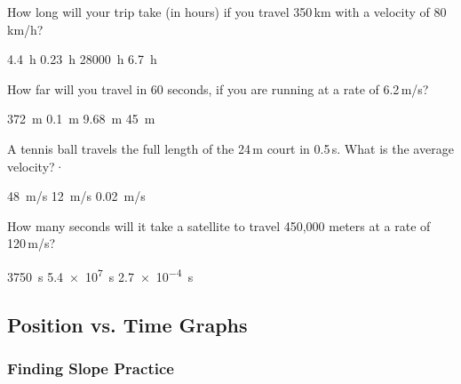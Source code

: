 \documentclass[answers]{exam}
\begin{document}
\begin{questions}
\question
How long will your trip take (in hours) if you travel 350\,km with a velocity of 80\,km/h?

\begin{randomizechoices}
    \correctchoice \SI{4.4}{h}
    \choice \SI{0.23}{h}
    \choice \SI{28000}{h}
    \choice \SI{6.7}{h}
\end{randomizechoices}

\question
How far will you travel in 60 seconds, if you are running at a rate of 6.2\,m/s?

\begin{randomizechoices}
    \correctchoice \SI{372}{m}
    \choice \SI{0.1}{m}
    \choice \SI{9.68}{m}
    \choice \SI{45}{m}
\end{randomizechoices}

\question
A tennis ball travels the full length of the 24\,m court in 0.5\,s. What is the average velocity?·

\begin{randomizechoices}
    \correctchoice \SI{48}{m/s}
    \choice \SI{12}{m/s}
    \choice \SI{0.02}{m/s}
\end{randomizechoices}

\question
How many seconds will it take a satellite to travel 450,000 meters at a rate of 120\,m/s?

\begin{randomizechoices}
    \correctchoice \SI{3750}{s}
    \choice \SI{5.4e7}{s}
    \choice \SI{2.7e-4}{s}
\end{randomizechoices}



\end{questions}

\clearpage

\subsection{Position vs. Time Graphs}

\subsubsection{Finding Slope Practice}
\end{document}
